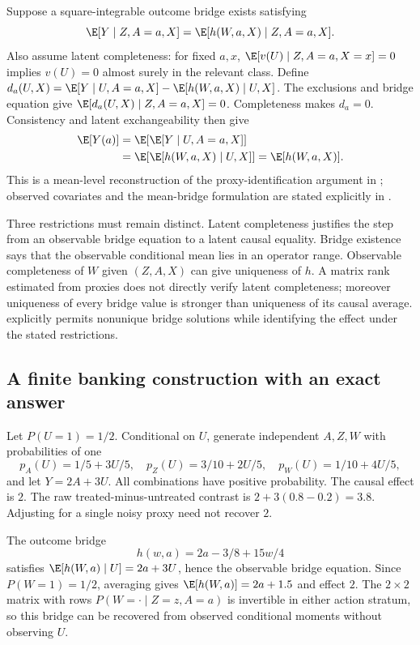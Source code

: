 Suppose a square-integrable outcome bridge exists satisfying
\begin{equation}
 \E[Y\mid Z,A=a,X]=\E[h(W,a,X)\mid Z,A=a,X].
 \label{r3:outcome-bridge}
\end{equation}
Also assume latent completeness: for fixed $a,x$,
$\E[v(U)\mid Z,A=a,X=x]=0$ implies $v(U)=0$ almost surely
in the relevant class. Define
$d_a(U,X)=\E[Y\mid U,A=a,X]-\E[h(W,a,X)\mid U,X]$.
The exclusions and bridge equation give
$\E[d_a(U,X)\mid Z,A=a,X]=0$. Completeness makes $d_a=0$.
Consistency and latent exchangeability then give
\begin{align}
 \E[Y(a)]&=\E[\E[Y\mid U,A=a,X]]\nonumber\\
 &=\E[\E[h(W,a,X)\mid U,X]]
  =\E[h(W,a,X)].
 \label{r3:proximal-mean}
\end{align}
This is a mean-level reconstruction of the proxy-identification
argument in \citet[Sections 2--3 and Theorem 1]{miao2018}; observed
covariates and the mean-bridge formulation are stated explicitly in
\citet[Section 4, Assumptions 4--6 and Theorem 3]{ghassami2022}.

Three restrictions must remain distinct. Latent completeness justifies
the step from an observable bridge equation to a latent causal equality.
Bridge existence says that the observable conditional mean lies in an
operator range. Observable completeness of $W$ given $(Z,A,X)$ can
give uniqueness of $h$. A matrix rank estimated from proxies does not
directly verify latent completeness; moreover uniqueness of every
bridge value is stronger than uniqueness of its causal average.
\citet{miao2018} explicitly permits nonunique bridge solutions while
identifying the effect under the stated restrictions.

\subsection{A finite banking construction with an exact answer}
Let $P(U=1)=1/2$. Conditional on $U$, generate independent $A,Z,W$
with probabilities of one
\[
 p_A(U)=1/5+3U/5,\quad
 p_Z(U)=3/10+2U/5,\quad
 p_W(U)=1/10+4U/5,
\]
and let $Y=2A+3U$. All combinations have positive probability.
The causal effect is $2$. The raw treated-minus-untreated contrast
is $2+3(0.8-0.2)=3.8$. Adjusting for a single noisy proxy need not
recover $2$.

The outcome bridge
\begin{equation}
 h(w,a)=2a-3/8+15w/4
 \label{r3:proxy-example-bridge}
\end{equation}
satisfies $\E[h(W,a)\mid U]=2a+3U$, hence the observable
bridge equation. Since $P(W=1)=1/2$, averaging gives
$\E[h(W,a)]=2a+1.5$ and effect $2$.
The $2\times2$ matrix with rows $P(W=\cdot\mid Z=z,A=a)$
is invertible in either action stratum, so this bridge can be recovered
from observed conditional moments without observing $U$.

